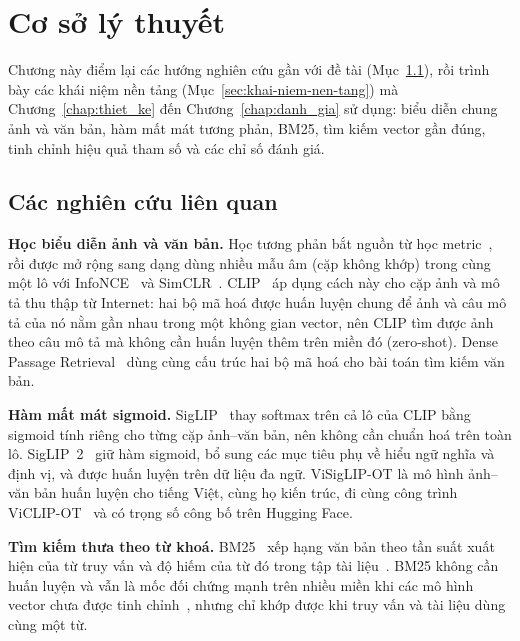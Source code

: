 \chapter{Cơ sở lý thuyết}
\label{chap:co_so_ly_thuyet}

Chương này điểm lại các hướng nghiên cứu gần với đề tài (Mục~\ref{sec:nghien-cuu-lien-quan}), rồi trình bày các khái niệm nền tảng (Mục~\ref{sec:khai-niem-nen-tang}) mà Chương~\ref{chap:thiet_ke} đến Chương~\ref{chap:danh_gia} sử dụng: biểu diễn chung ảnh và văn bản, hàm mất mát tương phản, BM25, tìm kiếm vector gần đúng, tinh chỉnh hiệu quả tham số và các chỉ số đánh giá.

\section{Các nghiên cứu liên quan}
\label{sec:nghien-cuu-lien-quan}

\textbf{Học biểu diễn ảnh và văn bản.} Học tương phản bắt nguồn từ học metric~\cite{hadsell2006contrastive}, rồi được mở rộng sang dạng dùng nhiều mẫu âm (cặp không khớp) trong cùng một lô với InfoNCE~\cite{oord2018cpc} và SimCLR~\cite{chen2020simclr}. CLIP~\cite{radford2021clip} áp dụng cách này cho cặp ảnh và mô tả thu thập từ Internet: hai bộ mã hoá được huấn luyện chung để ảnh và câu mô tả của nó nằm gần nhau trong một không gian vector, nên CLIP tìm được ảnh theo câu mô tả mà không cần huấn luyện thêm trên miền đó (zero-shot). Dense Passage Retrieval~\cite{karpukhin2020dpr} dùng cùng cấu trúc hai bộ mã hoá cho bài toán tìm kiếm văn bản.

\textbf{Hàm mất mát sigmoid.} SigLIP~\cite{zhai2023siglip} thay softmax trên cả lô của CLIP bằng sigmoid tính riêng cho từng cặp ảnh--văn bản, nên không cần chuẩn hoá trên toàn lô. SigLIP~2~\cite{tschannen2025siglip2} giữ hàm sigmoid, bổ sung các mục tiêu phụ về hiểu ngữ nghĩa và định vị, và được huấn luyện trên dữ liệu đa ngữ. ViSigLIP-OT là mô hình ảnh--văn bản huấn luyện cho tiếng Việt, cùng họ kiến trúc, đi cùng công trình ViCLIP-OT~\cite{viclipot2026} và có trọng số công bố trên Hugging Face.

\textbf{Tìm kiếm thưa theo từ khoá.} BM25~\cite{robertson1994okapi,robertson2009bm25} xếp hạng văn bản theo tần suất xuất hiện của từ truy vấn và độ hiếm của từ đó trong tập tài liệu~\cite{sparckjones1972idf}. BM25 không cần huấn luyện và vẫn là mốc đối chứng mạnh trên nhiều miền khi các mô hình vector chưa được tinh chỉnh~\cite{thakur2021beir}, nhưng chỉ khớp được khi truy vấn và tài liệu dùng cùng một từ.

